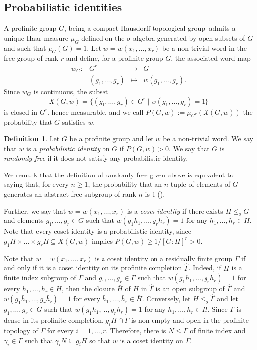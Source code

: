 \documentclass[a4paper,10pt]{amsart}
\theoremstyle{plain}
\theoremstyle{definition}
\newtheorem{definition}[thm]{Definition}
\numberwithin{equation}{section}
\begin{document}
\subsection{Probabilistic identities} 
A profinite group $G$, being a compact Hausdorff topological group, admits a unique Haar measure $\mu_G$ defined on the $\sigma$-algebra generated by open subsets of $G$ and such that $\mu_G(G)=1$. Let $w = w(x_1,\ldots,x_r)$ be a non-trivial word in the free group of rank $r$ and define, for a profinite group $G$, the associated word map 
\[
\begin{matrix}
	w_G \colon &  G^r  & \longrightarrow & G\\
	 & (g_1,\dots, g_r) & \longmapsto & w(g_1,\dots, g_r).
\end{matrix}
\]
Since $w_G$ is continuous, the subset \[ X(G,w)=\{(g_1,\dots,g_r)\in G^r\mid w(g_1,\dots,g_r)=1\} \]
is closed in $G^r$, hence measurable, and we call $P(G,w):=\mu_{G^r}(X(G,w))$ the probability that $G$ satisfies $w$. 
\begin{definition}
	Let $G$ be a profinite group and let $w$ be a non-trivial word.  We say that $w$ is a \emph{probabilistic identity} on $G$ if $P(G,w)>0$. We say that $G$ is \emph{randomly free} if it does not satisfy any probabilistic identity.
\end{definition}

We remark that the definition of randomly free given above is equivalent to saying that, for every $n\geq 1$, the probability that an $n$-tuple of elements of $G$ generates an abstract free subgroup of rank $n$ is 1 (\cite[Lemma 1.4]{LS18}).

Further, we say that $w = w(x_1,\ldots,x_r)$ is a \emph{coset identity} if there exists $H \leq_o G$ and elements $g_1,\ldots,g_r \in G$ such that $w(g_1 h_1,\ldots,g_r h_r) = 1$ for any $h_1,\ldots,h_r \in H$. Note that every coset identity is a probabilistic identity, since $g_1H \times \ldots \times g_rH \subseteq X(G,w)$ implies $P(G,w) \geq 1/[G:H]^r>0$. 

Note that $w=w(x_1,\dots,x_r)$ is a coset identity on a residually finite group $\Gamma$ if and only if it is a coset identity on its profinite completion $\widehat{\Gamma}$. Indeed, if $H$ is a finite index subgroup of $\Gamma$ and $g_1,\dots,g_r\in\Gamma$ such that $w(g_1h_1,\dots,g_rh_r)=1$ for every $h_1,\dots,h_r\in H$, then the closure $\overline{H}$ of $H$ in $\widehat{\Gamma}$ is an open subgroup of $\widehat{\Gamma}$ and $w(g_1\bar{h}_1,\dots,g_r\bar{h}_r)=1$ for every $\bar{h}_1,\dots,\bar{h}_r\in\overline{H}$. Conversely, let $H\leq_o\widehat{\Gamma}$ and let $g_1,\ldots,g_r \in G$ such that $w(g_1 h_1,\ldots,g_r h_r) = 1$ for any $h_1,\ldots,h_r \in H$. Since $\Gamma$ is dense in its profinite completion, $g_iH\cap\Gamma$ is non-empty and open in the profinite topology of $\Gamma$ for every $i=1,\dots,r$. Therefore, there is $N\leq \Gamma$ of finite index and $\gamma_i\in\Gamma$ such that $\gamma_iN\subseteq g_iH$ so that $w$ is a coset identity on $\Gamma$.   
\end{document}
